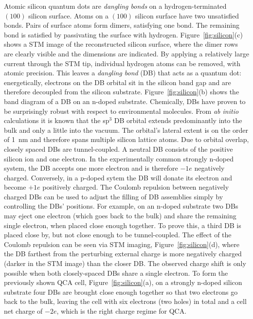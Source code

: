 Atomic silicon quantum dots are \emph{dangling bonds} on a hydrogen-terminated
$(100)$ silicon surface. Atoms on a $(100)$ silicon surface have two unsatisfied
bonds. Pairs of surface atoms form dimers, satisfying one bond. The remaining
bond is satisfied by passivating the surface with hydrogen.
Figure~\ref{fig:silicon}(c) shows a STM image of the reconstructed silicon
surface, where the dimer rows are clearly visible and the dimensions are
indicated. By applying a relatively large current through the STM tip,
individual hydrogen atoms can be removed, with atomic precision. This leaves a
\emph{dangling bond} (DB) that acts as a quantum dot: energetically, electrons
on the DB orbital sit in the silicon band gap and are therefore decoupled from
the silicon substrate. Figure~\ref{fig:silicon}(b) shows the band diagram of a
DB on an n-doped substrate. Chemically, DBs have proven to be surprisingly
robust with respect to environmental molecules. From \emph{ab initio}
calculations it is known that the sp$^3$ DB orbital extends predominantly into
the bulk and only a little into the vacuum. The orbital's lateral extent is on
the order of 1~nm and therefore spans multiple silicon lattice atoms. Due to
orbital overlap, closely spaced DBs are tunnel-coupled. A neutral DB consists of
the positive silicon ion and one electron. In the experimentally common strongly
n-doped system, the DB accepts one more electron and is therefore $-1e$
negatively charged. Conversely, in a p-doped sytem the DB will donate its
electron and become $+1e$ positively charged. The Coulomb repulsion between
negatively charged DBs can be used to adjust the filling of DB assemblies simply
by controlling the DBs' positions. For example, on an n-doped substrate two DBs
may eject one electron (which goes back to the bulk) and share the remaining
single electron, when placed close enough together. To prove this, a third DB is
placed close by, but not close enough to be tunnel-coupled. The effect of the
Coulomb repulsion can be seen via STM imaging, Figure~\ref{fig:silicon}(d),
where the DB farthest from the perturbing external charge is more negatively
charged (darker in the STM image) than the closer DB. The observed charge shift
is only possible when both closely-spaced DBs share a single electron. To form
the previously shown QCA cell, Figure~\ref{fig:silicon}(a), on a strongly
n-doped silicon substrate four DBs are brought close enough together so that two
electrons go back to the bulk, leaving the cell with six electrons (two holes)
in total and a cell net charge of $-2e$, which is the right charge regime for
QCA.

